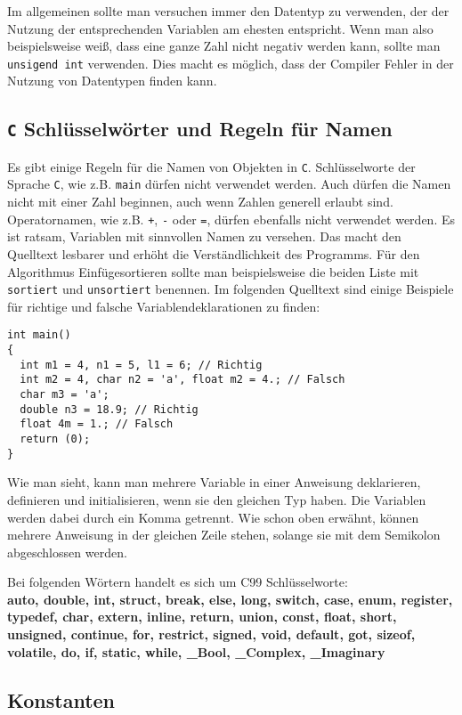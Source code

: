 Im allgemeinen sollte man versuchen immer den Datentyp zu verwenden, der der Nutzung der entsprechenden Variablen am ehesten entspricht.
Wenn man also beispielsweise weiß, dass eine ganze Zahl nicht negativ werden kann, sollte man \texttt{unsigend int} verwenden.
Dies macht es möglich, dass der Compiler Fehler in der Nutzung von Datentypen finden kann.

\subsection{\texttt{C} Schlüsselwörter und Regeln für Namen}

Es gibt einige Regeln für die Namen von Objekten in \texttt{C}. 
Schlüsselworte der Sprache \texttt{C}, wie z.B. \texttt{main} dürfen nicht verwendet werden.
Auch dürfen die Namen nicht mit einer Zahl beginnen, auch wenn Zahlen generell erlaubt sind.
Operatornamen, wie z.B. \verb|+|, \verb|-| oder \verb|=|, dürfen ebenfalls nicht verwendet werden.
Es ist ratsam, Variablen mit sinnvollen Namen zu versehen.
Das macht den Quelltext lesbarer und erhöht die Verständlichkeit des Programms.
Für den Algorithmus Einfügesortieren sollte man beispielsweise die beiden Liste mit \texttt{sortiert} und \texttt{unsortiert} benennen.
Im folgenden Quelltext sind einige Beispiele für richtige und falsche Variablendeklarationen zu finden:
\begin{lstlisting}
int main()
{
  int m1 = 4, n1 = 5, l1 = 6; // Richtig
  int m2 = 4, char n2 = 'a', float m2 = 4.; // Falsch
  char m3 = 'a';
  double n3 = 18.9; // Richtig
  float 4m = 1.; // Falsch
  return (0);
}
\end{lstlisting} 
Wie man sieht, kann man mehrere Variable in einer Anweisung deklarieren, definieren und initialisieren, wenn sie den gleichen Typ haben.
Die Variablen werden dabei durch ein Komma getrennt.
Wie schon oben erwähnt, können mehrere Anweisung in der gleichen Zeile stehen, solange sie mit dem Semikolon abgeschlossen werden.

Bei folgenden Wörtern handelt es sich um C99 Schlüsselworte:\\
\textbf{auto, double, int, struct, break, else, long, switch, case,
  enum, register, typedef, char, extern, inline, return, union, const, float,
  short, unsigned, continue, for, restrict, signed, void, default, got, sizeof,
  volatile, do, if, static, while, \_Bool, \_Complex, \_Imaginary}

\subsection{Konstanten}

